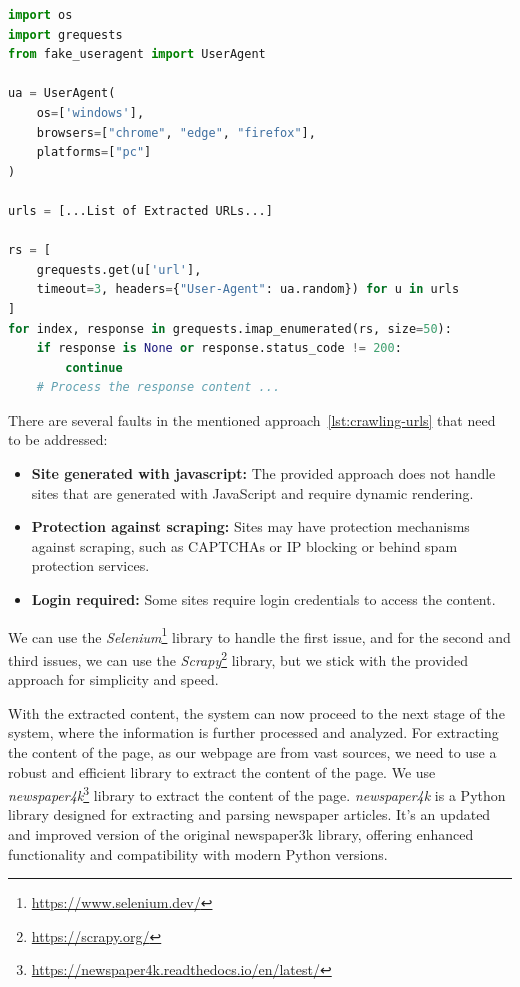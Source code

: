 \begin{lstlisting}[language=Python, caption=Crawling the extracted URLs, label=lst:crawling-urls]
import os
import grequests
from fake_useragent import UserAgent

ua = UserAgent(
    os=['windows'],
    browsers=["chrome", "edge", "firefox"],
    platforms=["pc"]
)

urls = [...List of Extracted URLs...]

rs = [
    grequests.get(u['url'],
    timeout=3, headers={"User-Agent": ua.random}) for u in urls
]
for index, response in grequests.imap_enumerated(rs, size=50):
    if response is None or response.status_code != 200:
        continue
    # Process the response content ...
\end{lstlisting}

There are several faults in the mentioned approach~\ref{lst:crawling-urls} that need to be addressed:
\begin{itemize}
    \item \textbf{Site generated with javascript:} The provided approach does not handle sites that are generated with JavaScript and require dynamic rendering.
    \item \textbf{Protection against scraping:} Sites may have protection mechanisms against scraping, such as CAPTCHAs or IP blocking or behind spam protection services.
    \item \textbf{Login required:} Some sites require login credentials to access the content.
\end{itemize}

We can use the \textit{Selenium}\footnote{\url{https://www.selenium.dev/}} library to handle the first issue, and for the second and third issues, we can use the \textit{Scrapy}\footnote{\url{https://scrapy.org/}} library, but we stick with the provided approach for simplicity and speed.

With the extracted content, the system can now proceed to the next stage of the system, where the information is further processed and analyzed.
For extracting the content of the page, as our webpage are from vast sources, we need to use a robust and efficient library to extract the content of the page.
We use \textit{newspaper4k}\footnote{\url{https://newspaper4k.readthedocs.io/en/latest/}} library to extract the content of the page.
\textit{newspaper4k} is a Python library designed for extracting and parsing newspaper articles. It's an updated and improved version of the original newspaper3k library, offering enhanced functionality and compatibility with modern Python versions.

